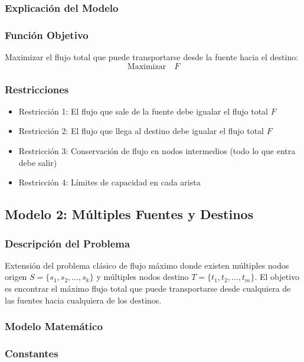 \documentclass[12pt]{article}
\begin{document}
\subsubsection{Explicación del Modelo}

\subsubsection*{Función Objetivo}

Maximizar el flujo total que puede transportarse desde la fuente hacia el destino:
\[
\text{Maximizar} \quad F
\]

\subsubsection*{Restricciones}

\begin{itemize}
    \item Restricción 1: El flujo que sale de la fuente debe igualar el flujo total $F$
    \item Restricción 2: El flujo que llega al destino debe igualar el flujo total $F$
    \item Restricción 3: Conservación de flujo en nodos intermedios (todo lo que entra debe salir)
    \item Restricción 4: Límites de capacidad en cada arista
\end{itemize}

\subsection{Modelo 2: Múltiples Fuentes y Destinos}

\subsubsection{Descripción del Problema}

Extensión del problema clásico de flujo máximo donde existen múltiples nodos origen $S = \{s_1, s_2, \ldots, s_k\}$ y múltiples nodos destino $T = \{t_1, t_2, \ldots, t_m\}$. El objetivo es encontrar el máximo flujo total que puede transportarse desde cualquiera de las fuentes hacia cualquiera de los destinos.

\subsubsection{Modelo Matemático}

\subsubsection*{Constantes}
\end{document}
